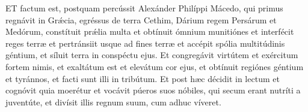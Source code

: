 







\lettrine[lines=2]{E}{T} factum est, postquam percússit Alexánder Philíppi Mácedo, qui primus regnávit in Grǽcia, egréssus de terra Cethim, Dárium regem Persárum et Medórum, constítuit prǽlia multa et obtínuit ómnium munitiónes et interfécit reges terræ et pertránsiit usque ad fines terræ et accépit spólia multitúdinis géntium, et síluit terra in conspéctu ejus. Et congregávit virtútem et exércitum fortem nimis, et exaltátum est et elevátum cor ejus, et obtínuit regiónes géntium et tyránnos, et facti sunt illi in tribútum. Et post hæc décidit in lectum et cognóvit quia moerétur et vocávit púeros suos nóbiles, qui secum erant nutríti a juventúte, et divísit illis regnum suum, cum adhuc víveret.

